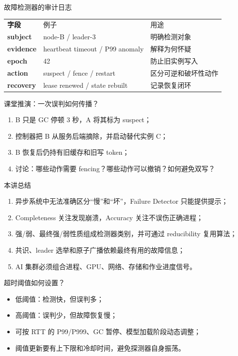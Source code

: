 \documentclass[UTF8,fontset=none,aspectratio=169,10pt]{beamer}
\begin{document}
\begin{frame}{故障检测器的审计日志}
\begin{tabularx}{\linewidth}{>{\bfseries}p{3cm}XX}
\toprule
字段 & 例子 & 用途 \\
subject & node-B / leader-3 & 明确检测对象 \\
evidence & heartbeat timeout / P99 anomaly & 解释为何怀疑 \\
epoch & 42 & 防止旧实例写入 \\
action & suspect / fence / restart & 区分可逆和破坏性动作 \\
recovery & lease renewed / state rebuilt & 记录恢复闭环 \\
\bottomrule
\end{tabularx}
\end{frame}

\begin{frame}{课堂推演：一次误判如何传播？}
\begin{enumerate}
  \item B 只是 GC 停顿 3 秒，A 将其标为 suspect；
  \item 控制器把 B 从服务后端摘除，并启动替代实例 C；
  \item B 恢复后仍持有旧缓存和旧写 token；
  \item 讨论：哪些动作需要 fencing？哪些动作可以撤销？如何避免双写？
\end{enumerate}
\vfill
{}
\end{frame}

\begin{frame}{本讲总结}
\begin{enumerate}
  \item 异步系统中无法准确区分“慢”和“坏”，Failure Detector 只能提供提示；
  \item Completeness 关注发现崩溃，Accuracy 关注不误伤正确进程；
  \item 强/弱、最终强/弱性质组成检测器类别，并可通过 reducibility 复用算法；
  \item 共识、leader 选举和原子广播依赖最终有用的故障信息；
  \item AI 集群必须组合进程、GPU、网络、存储和作业进度信号。
\end{enumerate}
\vfill
{}
\end{frame}

\begin{frame}{超时阈值如何设置？}
\begin{itemize}
  \item 低阈值：检测快，但误判多；
  \item 高阈值：误判少，但故障恢复慢；
  \item 可按 RTT 的 P99/P999、GC 暂停、模型加载阶段动态调整；
  \item 阈值更新要有上下限和冷却时间，避免探测器自身振荡。
\end{itemize}
\vfill
{}
\end{frame}
\end{document}
